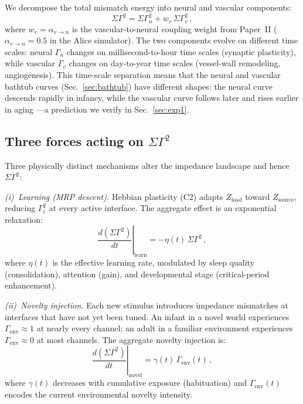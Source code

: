 ﻿\documentclass[aps,pre,twocolumn,superscriptaddress,floatfix]{revtex4-2}
\begin{document}
We decompose the total mismatch energy into neural and
vascular components:
\begin{equation}
  \Sigma\Gamma^2 = \Sigma\Gamma_n^2 + w_v\,\Sigma\Gamma_v^2\,,
  \label{eq:sigma-gamma-dual}
\end{equation}
where $w_v = \alpha_{v\to n}$ is the vascular-to-neural
coupling weight from Paper~II
($\alpha_{v\to n} = 0.5$ in the Alice simulator).
The two components evolve on different time scales:
neural $\Gamma_n$ changes on millisecond-to-hour time scales
(synaptic plasticity), while vascular $\Gamma_v$ changes on
day-to-year time scales (vessel-wall remodeling,
angiogenesis).
This time-scale separation means that the neural and vascular
bathtub curves (Sec.~\ref{sec:bathtub}) have different shapes:
the neural curve descends rapidly in infancy, while the
vascular curve follows later and rises earlier in aging
---a prediction we verify in Sec.~\ref{sec:exp1}.


\subsection{Three forces acting on $\Sigma\Gamma^2$}

Three physically distinct mechanisms alter the impedance
landscape and hence $\Sigma\Gamma^2$:

\emph{(i)~Learning (MRP descent).}
Hebbian plasticity (C2) adapts $Z_{\mathrm{load}}$
toward $Z_{\mathrm{source}}$, reducing $\Gamma_i^2$
at every active interface.
The aggregate effect is an exponential relaxation:
\begin{equation}
  \left.\frac{d(\Sigma\Gamma^2)}{dt}\right|_{\mathrm{learn}}
    = -\eta(t)\,\Sigma\Gamma^2\,,
  \label{eq:learning-term}
\end{equation}
where $\eta(t)$ is the effective learning rate,
modulated by sleep quality (consolidation),
attention (gain), and developmental stage
(critical-period enhancement).

\emph{(ii)~Novelty injection.}
Each new stimulus introduces impedance mismatches
at interfaces that have not yet been tuned.
An infant in a novel world experiences $\Gamma_{\mathrm{env}}
\approx 1$ at nearly every channel;
an adult in a familiar environment experiences
$\Gamma_{\mathrm{env}} \approx 0$ at most channels.
The aggregate novelty injection is:
\begin{equation}
  \left.\frac{d(\Sigma\Gamma^2)}{dt}\right|_{\mathrm{novel}}
    = \gamma(t)\,\Gamma_{\mathrm{env}}(t)\,,
  \label{eq:novelty-term}
\end{equation}
where $\gamma(t)$ decreases with cumulative exposure
(habituation) and $\Gamma_{\mathrm{env}}(t)$ encodes
the current environmental novelty intensity.
\end{document}
